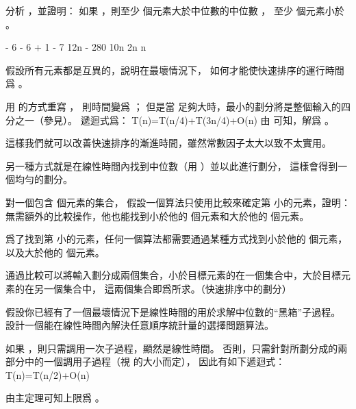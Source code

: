 分析 ，並證明：
如果 ，則至少  個元素大於中位數的中位數 ，
至少  個元素小於 。
\stopEXERCISE

\startANSWER
\startformula\startmathalignment[n=1]
\NC {} - 6 \ge \left\lceil {} \right\rceil \NR
\NC \Downarrow \NR
\NC {} - 6 \ge {} + 1 \NR
\NC \Downarrow \NR
\NC {} - 7 \ge {} \NR
\NC \Downarrow \NR
\NC 12n - 280 \ge 10n \NR
\NC \Downarrow \NR
\NC 2n  \NR
\NC \Downarrow \NR
\NC n  \NR
\stopmathalignment\stopformula
\stopANSWER

\startEXERCISE
假設所有元素都是互異的，說明在最壞情況下，
如何才能使快速排序的運行時間爲 。
\stopEXERCISE

\startANSWER
用  的方式重寫 ，
則時間變爲 ；
但是當  足夠大時，最小的劃分將是整個輸入的四分之一（參見）。
遞迴式爲：
\startformula
T(n)=T(n/4)+T(3n/4)+O(n)
\stopformula
由 可知，解爲 。

這樣我們就可以改善快速排序的漸進時間，雖然常數因子太大以致不太實用。

另一種方式就是在線性時間內找到中位數（用 ）並以此進行劃分，
這樣會得到一個均勻的劃分。
\stopANSWER

\startEXERCISE\DIFFICULT
對一個包含  個元素的集合，
假設一個算法只使用比較來確定第  小的元素，證明：
無需額外的比較操作，他也能找到小於他的  個元素和大於他的  個元素。
\stopEXERCISE

\startANSWER
爲了找到第  小的元素，任何一個算法都需要通過某種方式找到小於他的  個元素，
以及大於他的  個元素。

通過比較可以將輸入劃分成兩個集合，小於目標元素的在一個集合中，大於目標元素的在另一個集合中，
這兩個集合即爲所求。（快速排序中的劃分）
\stopANSWER

\startEXERCISE
假設你已經有了一個最壞情況下是線性時間的用於求解中位數的“黑箱”子過程。
設計一個能在線性時間內解決任意順序統計量的選擇問題算法。
\stopEXERCISE

\startANSWER
如果 ，則只需調用一次子過程，顯然是線性時間。
否則，只需針對所劃分成的兩部分中的一個調用子過程（視  的大小而定），
因此有如下遞迴式：
\startformula
T(n)=T(n/2)+O(n)
\stopformula

由主定理可知上限爲 。
\stopANSWER

